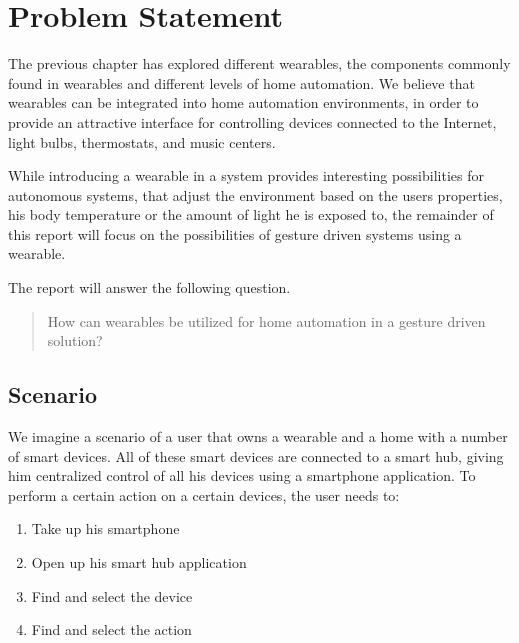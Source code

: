 \section{Problem Statement}\label{sec:researchstatement}

The previous chapter has explored different wearables, 
the components commonly found in wearables and different levels of home automation. 
We believe that wearables can be integrated into home automation environments, 
in order to provide an attractive interface for controlling devices connected to the Internet, 
\eg light bulbs, thermostats, and music centers.

While introducing a wearable in a system provides interesting possibilities for autonomous systems, 
that adjust the environment based on the users properties, 
\eg his body temperature or the amount of light he is exposed to, 
the remainder of this report will focus on the possibilities of gesture driven systems using a wearable.

The report will answer the following question.

\begin{framed}
    \begin{quote}
      How can wearables be utilized for home automation in a gesture driven solution?
    \end{quote}
\end{framed}

\subsection{Scenario}
We imagine a scenario of a user that owns a wearable and a home with a number of smart devices. 
All of these smart devices are connected to a smart hub, 
giving him centralized control of all his devices using \eg a smartphone application.
To perform a certain action on a certain devices, the user needs to:
\begin{enumerate}
  \item Take up his smartphone
  \item Open up his smart hub application
  \item Find and select the device
  \item Find and select the action
\end{enumerate}

